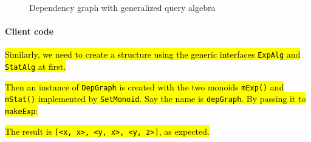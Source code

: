 \begin{figure}[t]
\nocaptionrule
\caption{Dependency graph with generalized query algebra}
\label{deps2}
\end{figure}

\paragraph{Client code}
\hl{Similarly, we need to create a structure using the generic interfaces \lstinline{ExpAlg} and \lstinline{StatAlg} at first.}


\hl{Then an instance of \lstinline{DepGraph} is created with the two monoids \lstinline{mExp()} and \lstinline{mStat()} implemented
by \lstinline{SetMonoid}. Say the name is \lstinline{depGraph}. By passing it to \lstinline{makeExp}:}


\hl{The result is \lstinline{[<x, x>, <y, x>, <y, z>]}, as expected.}
